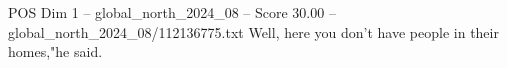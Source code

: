 \begin{textsample}{POS Dim 1 – global\_north\_2024\_08 – Score 30.00 – global\_north\_2024\_08/112136775.txt}
Well, here you don't have people in their homes,"he said.

\end{textsample}
